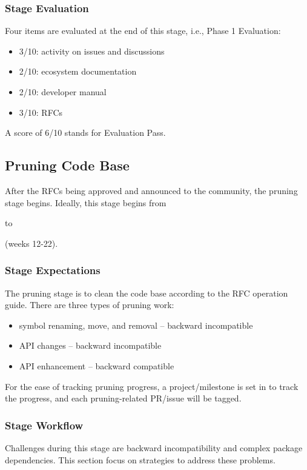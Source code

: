 \subsubsection*{Stage Evaluation}

Four items are evaluated at the end of this stage, i.e., \textsf{Phase 1 Evaluation}:
\begin{itemize}
    \item 3/10: activity on issues and discussions
    \item 2/10: ecosystem documentation
    \item 2/10: developer manual
    \item 3/10: RFCs
\end{itemize}
A score of 6/10 stands for \textsf{Evaluation Pass}.

\subsection{Pruning Code Base}\label{subsec:prune}
After the RFCs being approved and announced to the community, the pruning stage begins. Ideally, this stage begins from \date{July 1} to \date{August 26} (weeks 12-22).

\subsubsection*{Stage Expectations}

The pruning stage is to clean the code base according to the RFC operation guide. There are three types of pruning work:
\begin{itemize}
    \item symbol renaming, move, and removal -- backward incompatible
    \item API changes -- backward incompatible
    \item API enhancement -- backward compatible
\end{itemize}
For the ease of tracking pruning progress, a project/milestone is set in \repoimages{} to track the progress, and each pruning-related PR/issue will be tagged. \par

\subsubsection*{Stage Workflow}

Challenges during this stage are backward incompatibility and complex package dependencies. This section focus on strategies to address these problems. \par

